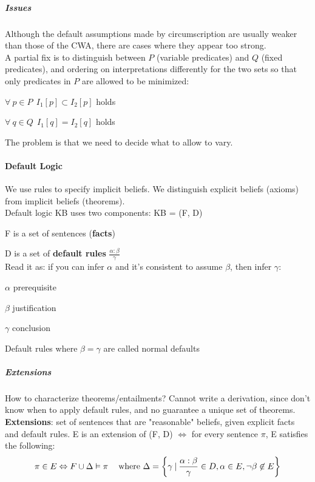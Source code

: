 \documentclass[10pt]{report}
\begin{document}
\subparagraph{Issues} Although the default assumptions made by circumscription are usually weaker than those of the CWA, there are cases where they appear too strong.\\
A partial fix is to distinguish between $P$ (variable predicates) and $Q$ (fixed predicates), and ordering on interpretations differently for the two sets so that only predicates in $P$ are allowed to be minimized:
\begin{list}{}{}
	\item $\forall\:p\in P\:\:I_1[p] \subset I_2[p]$ holds
	\item $\forall\:q\in Q\:\:I_1[q] = I_2[q]$ holds
\end{list}
The problem is that we need to decide what to allow to vary.
\paragraph{Default Logic} We use rules to specify implicit beliefs. We distinguish explicit beliefs (axioms) from implicit beliefs (theorems).\\
Default logic KB uses two components: KB = (F, D)
\begin{list}{}{}
	\item F is a set of sentences (\textbf{facts})
	\item D is a set of \textbf{default rules} $\frac{\alpha : \beta}{\gamma}$\\
	Read it as: if you can infer $\alpha$ and it's consistent to assume $\beta$, then infer $\gamma$:
	\begin{list}{}{}
		\item $\alpha$ prerequisite
		\item $\beta$ justification
		\item $\gamma$ conclusion
	\end{list}
	Default rules where $\beta = \gamma$ are called normal defaults
\end{list}
\subparagraph{Extensions} How to characterize theorems/entailments? Cannot write a derivation, since don't know when to apply default rules, and no guarantee a unique set of theorems.\\
\textbf{Extensions}: set of sentences that are "reasonable" beliefs, given explicit facts and default rules. E is an extension of (F, D) $\Leftrightarrow$ for every sentence $\pi$, E satisfies the following:
$$\pi\in E\Leftrightarrow F\cup\Delta \vDash \pi\:\:\:\: \hbox{ where }\Delta=\left\{\gamma\:|\:\frac{\alpha : \beta}{\gamma}\in D, \alpha\in E, \neg\beta\not\in E\right\}$$
\end{document}
